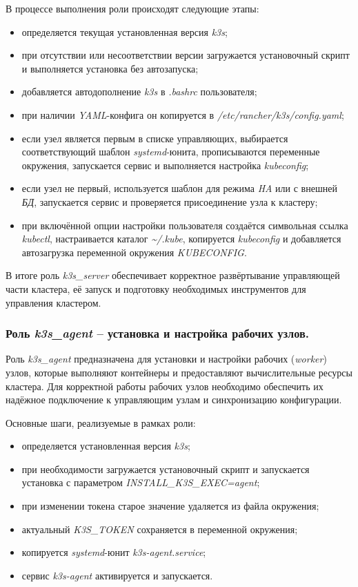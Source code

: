 В процессе выполнения роли происходят следующие этапы:
\begin{itemize}
  \item определяется текущая установленная версия \textit{k3s};
  \item при отсутствии или несоответствии версии загружается установочный скрипт и выполняется установка без автозапуска;
  \item добавляется автодополнение \textit{k3s} в \textit{.bashrc} пользователя;
  \item при наличии \textit{YAML}-конфига он копируется в \textit{/etc/rancher/k3s/config.yaml};
  \item если узел является первым в списке управляющих, выбирается соответствующий шаблон \textit{systemd}-юнита, прописываются переменные окружения, запускается сервис и выполняется настройка \textit{kubeconfig};
  \item если узел не первый, используется шаблон для режима \textit{HA} или с внешней \textit{БД}, запускается сервис и проверяется присоединение узла к кластеру;
  \item при включённой опции настройки пользователя создаётся символьная ссылка \textit{kubectl}, настраивается каталог \textit{\textasciitilde/.kube}, копируется \textit{kubeconfig} и добавляется автозагрузка переменной окружения \textit{KUBECONFIG}.
\end{itemize}

В итоге роль \textit{k3s\_server} обеспечивает корректное развёртывание управляющей части кластера, её запуск и подготовку необходимых инструментов для управления кластером.

\subsubsection{Роль \textit{k3s\_agent} -- установка и настройка рабочих узлов.}
Роль \textit{k3s\_agent} предназначена для установки и настройки рабочих (\textit{worker}) узлов, которые выполняют контейнеры и предоставляют вычислительные ресурсы кластера. Для корректной работы рабочих узлов необходимо обеспечить их надёжное подключение к управляющим узлам и синхронизацию конфигурации.

Основные шаги, реализуемые в рамках роли:
\begin{itemize}
  \item определяется установленная версия \textit{k3s};
  \item при необходимости загружается установочный скрипт и запускается установка с параметром \textit{INSTALL\_K3S\_EXEC=agent};
  \item при изменении токена старое значение удаляется из файла окружения;
  \item актуальный \textit{K3S\_TOKEN} сохраняется в переменной окружения;
  \item копируется \textit{systemd}-юнит \textit{k3s-agent.service};
  \item сервис \textit{k3s-agent} активируется и запускается.
\end{itemize}

